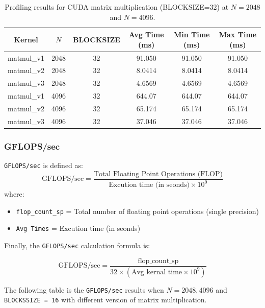 \documentclass[11pt]{article}
\begin{document}
\begin{table}[H]
\centering
\begin{tabular}{|c|c|c|c|c|c|}
\hline
Kernel      & $N$   & BLOCKSIZE & Avg Time (ms) & Min Time (ms) & Max Time (ms) \\ \hline
matmul\_v1  & 2048  & 32        & 91.050        & 91.050        & 91.050        \\
matmul\_v2  & 2048  & 32        & 8.0414        & 8.0414        & 8.0414        \\
matmul\_v3  & 2048  & 32        & 4.6569        & 4.6569        & 4.6569        \\ \hline
matmul\_v1  & 4096  & 32        & 644.07        & 644.07        & 644.07        \\
matmul\_v2  & 4096  & 32        & 65.174        & 65.174        & 65.174        \\
matmul\_v3  & 4096  & 32        & 37.046        & 37.046        & 37.046        \\ \hline
\end{tabular}
\caption{Profiling results for CUDA matrix multiplication (BLOCKSIZE=32) at $N=2048$ and $N=4096$.}
\label{tab:matmul_combined}
\end{table}


\subsubsection{GFLOPS/sec}
\verb|GFLOPS/sec| is defined as: 
\[
\text{GFLOPS/sec} = \frac{\text{Total Floating Point Operations (FLOP)}}{\text{Excution time (in seonds)} \times 10^9}
\]
where:
\begin{itemize}
    \item \texttt{flop\_count\_sp} = Total number of floating point operations (single precision)
    \item \texttt{Avg Times} = Excution time (in seonds)
\end{itemize}
Finally, the \verb|GFLOPS/sec| calculation formula is:

\[
\text{GFLOPS/sec} = \frac{\text{flop\_count\_sp}}{32 \times (\text{Avg kernal time} \times 10^9)
}
\]

The following table is the \verb|GFLOPS/sec| results when $N = 2048, 4096$ and \verb|BLOCKSSIZE = 16| with different version of matrix multiplication.
\end{document}
